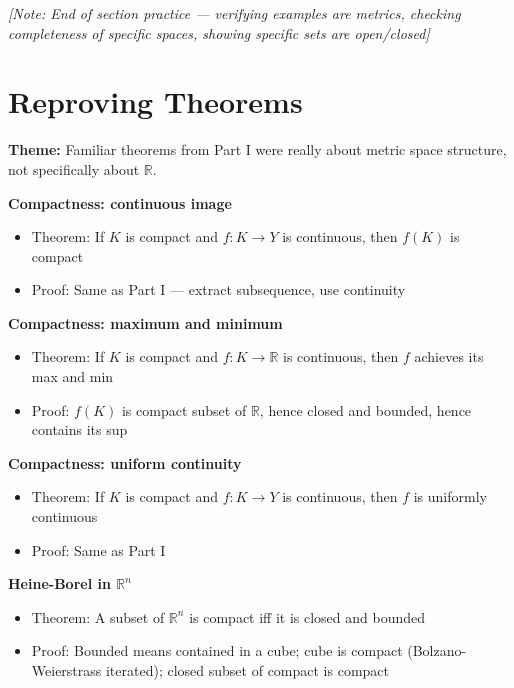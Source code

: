 \documentclass[
  10pt,
  letterpaper,
]{scrbook}
\providecommand{\tightlist}{%
  \setlength{\itemsep}{0pt}\setlength{\parskip}{0pt}}
\begin{document}
\emph{{[}Note: End of section practice --- verifying examples are
metrics, checking completeness of specific spaces, showing specific sets
are open/closed{]}}

\section{Reproving Theorems}\label{reproving-theorems}

\textbf{Theme:} Familiar theorems from Part I were really about metric
space structure, not specifically about \(\mathbb{R}\).

\textbf{Compactness: continuous image}

\begin{itemize}
\tightlist
\item
  Theorem: If \(K\) is compact and \(f: K \to Y\) is continuous, then
  \(f(K)\) is compact
\item
  Proof: Same as Part I --- extract subsequence, use continuity
\end{itemize}

\textbf{Compactness: maximum and minimum}

\begin{itemize}
\tightlist
\item
  Theorem: If \(K\) is compact and \(f: K \to \mathbb{R}\) is
  continuous, then \(f\) achieves its max and min
\item
  Proof: \(f(K)\) is compact subset of \(\mathbb{R}\), hence closed and
  bounded, hence contains its sup
\end{itemize}

\textbf{Compactness: uniform continuity}

\begin{itemize}
\tightlist
\item
  Theorem: If \(K\) is compact and \(f: K \to Y\) is continuous, then
  \(f\) is uniformly continuous
\item
  Proof: Same as Part I
\end{itemize}

\textbf{Heine-Borel in \(\mathbb{R}^n\)}

\begin{itemize}
\tightlist
\item
  Theorem: A subset of \(\mathbb{R}^n\) is compact iff it is closed and
  bounded
\item
  Proof: Bounded means contained in a cube; cube is compact
  (Bolzano-Weierstrass iterated); closed subset of compact is compact
\end{itemize}
\end{document}
